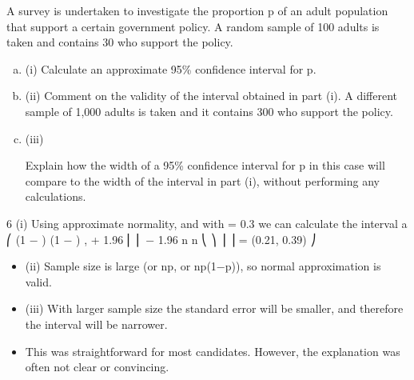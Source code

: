 \documentclass[a4paper,12pt]{article}
\begin{document}
A survey is undertaken to investigate the proportion p of an adult population that
support a certain government policy. A random sample of 100 adults is taken and
contains 30 who support the policy.
\begin{enumerate}[(a)]
\item (i) Calculate an approximate 95\% confidence interval for p. 
\item (ii) Comment on the validity of the interval obtained in part (i). 
A different sample of 1,000 adults is taken and it contains 300 who support the policy.
\item (iii)

Explain how the width of a 95\% confidence interval for p in this case will
compare to the width of the interval in part (i), without performing any
calculations.
\end{enumerate}



6
(i)
Using approximate normality, and with  = 0.3 we can calculate the interval a
⎛
 (1 −  )
 (1 −  )
,  + 1.96
⎜ ⎜  − 1.96
n
n
⎝
⎞
⎟ ⎟ = (0.21, 0.39)
⎠
\begin{itemize}
    \item (ii) Sample size is large (or np, or np(1−p)), so normal approximation is valid.
\item (iii) With larger sample size the standard error will be smaller, and therefore the
interval will be narrower.
\item This was straightforward for most candidates. However, the explanation was often not clear
or convincing.
\end{itemize}
\end{document}
